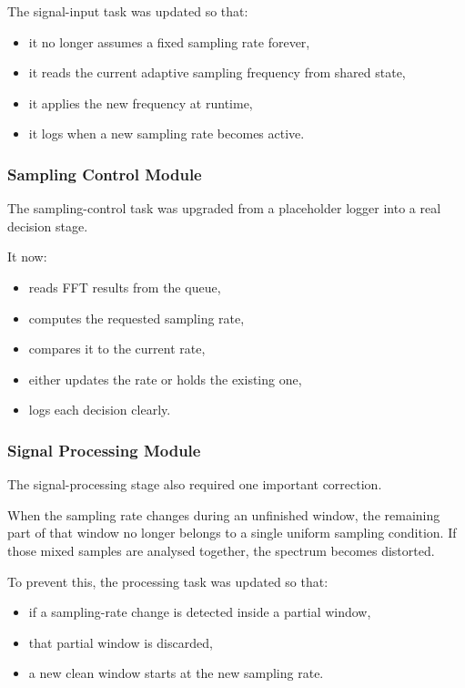 \documentclass[12pt,a4paper]{article}
\begin{document}
The signal-input task was updated so that:

\begin{itemize}
    \item it no longer assumes a fixed sampling rate forever,
    \item it reads the current adaptive sampling frequency from shared state,
    \item it applies the new frequency at runtime,
    \item it logs when a new sampling rate becomes active.
\end{itemize}

\subsubsection{Sampling Control Module}

The sampling-control task was upgraded from a placeholder logger into a real
decision stage.

It now:

\begin{itemize}
    \item reads FFT results from the queue,
    \item computes the requested sampling rate,
    \item compares it to the current rate,
    \item either updates the rate or holds the existing one,
    \item logs each decision clearly.
\end{itemize}

\subsubsection{Signal Processing Module}

The signal-processing stage also required one important correction.

When the sampling rate changes during an unfinished window, the remaining part
of that window no longer belongs to a single uniform sampling condition. If
those mixed samples are analysed together, the spectrum becomes distorted.

To prevent this, the processing task was updated so that:

\begin{itemize}
    \item if a sampling-rate change is detected inside a partial window,
    \item that partial window is discarded,
    \item a new clean window starts at the new sampling rate.
\end{itemize}
\end{document}
